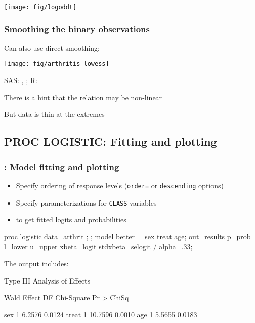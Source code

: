 \begin{frame}
\begin{center}
  \texttt{[image: fig/logoddt]}
\end{center}
\end{frame}

\begin{frame}
\frametitle{Smoothing the binary observations}
Can also use direct smoothing:
\begin{center}
  \texttt{[image: fig/arthritis-lowess]}
\end{center}
\begin{itemize*}
 \item SAS: , ; R: 
 \item There is a hint that the relation may be non-linear
 \item But data is thin at the extremes
\end{itemize*}

\end{frame}

\subsection{PROC LOGISTIC: Fitting and plotting}
\begin{frame}[fragile]
  \frametitle{: Model fitting and plotting}
  \begin{itemize}
	\item Specify ordering of response levels (\texttt{order=} or \texttt{descending} options)
	\item Specify parameterizations for \texttt{CLASS} variables
	\item {} to get fitted logits and probabilities
  \end{itemize}
  \vspace{1ex}
\begin{Input}[label=\fbox{\texttt{glogist1c.sas} $\cdots$},baselinestretch=0.7]
\vspace{.2ex}
proc logistic data=arthrit ;
   ;
   model better = sex  treat  age;
    out=results 
          p=prob l=lower u=upper
          xbeta=logit stdxbeta=selogit / alpha=.33;
\end{Input}
The output includes:
\begin{Output}[gobble=5,fontsize=\small,baselinestretch=0.8]
                    Type III Analysis of Effects
 
                                     Wald
             Effect      DF    Chi-Square    Pr > ChiSq

             sex          1        6.2576        0.0124
             treat        1       10.7596        0.0010
             age          1        5.5655        0.0183
\end{Output}
\end{frame}

